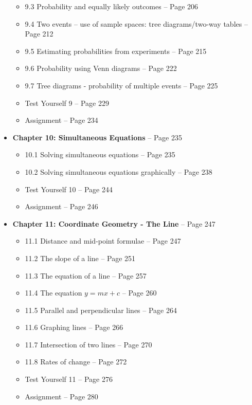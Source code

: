 \documentclass{article}
\begin{document}
\begin{itemize}
\begin{itemize}
            \item 9.3 Probability and equally likely outcomes -- Page 206
            \item 9.4 Two events – use of sample spaces: tree diagrams/two-way tables -- Page 212
            \item 9.5 Estimating probabilities from experiments -- Page 215
            \item 9.6 Probability using Venn diagrams -- Page 222
            \item 9.7 Tree diagrams - probability of multiple events -- Page 225
            \item Test Yourself 9 -- Page 229
            \item Assignment -- Page 234
        \end{itemize}
    \item \textbf{Chapter 10: Simultaneous Equations} -- Page 235
        \begin{itemize}
            \item 10.1 Solving simultaneous equations -- Page 235
            \item 10.2 Solving simultaneous equations graphically -- Page 238
            \item Test Yourself 10 -- Page 244
            \item Assignment -- Page 246
        \end{itemize}\newpage
    \item \textbf{Chapter 11: Coordinate Geometry - The Line} -- Page 247
        \begin{itemize}
            \item 11.1 Distance and mid-point formulae -- Page 247
            \item 11.2 The slope of a line -- Page 251
            \item 11.3 The equation of a line -- Page 257
            \item 11.4 The equation \(y = mx + c\) -- Page 260
            \item 11.5 Parallel and perpendicular lines -- Page 264
            \item 11.6 Graphing lines -- Page 266
            \item 11.7 Intersection of two lines -- Page 270
            \item 11.8 Rates of change -- Page 272
            \item Test Yourself 11 -- Page 276
            \item Assignment -- Page 280
        \end{itemize}

\end{itemize}
\end{document}
